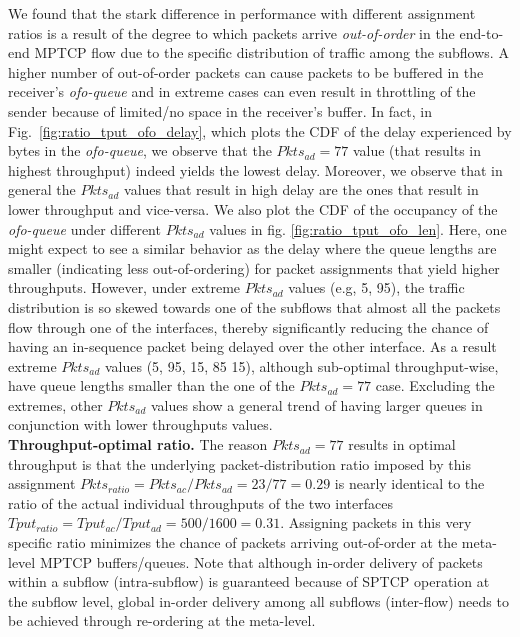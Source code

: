 We found that the stark difference in performance with different
assignment ratios is a result of the degree to which packets arrive
\textit{out-of-order} in the end-to-end MPTCP flow due to
the specific distribution of traffic among the subflows.
A higher number of out-of-order packets can cause
packets to be buffered in the receiver's \emph{ofo-queue} and in
extreme cases can even result in throttling of the sender because of
limited/no space in the receiver's buffer. In fact, in
Fig.~\ref{fig:ratio_tput_ofo_delay}, which plots the CDF of the delay
experienced by bytes in the \emph{ofo-queue}, we observe that
the $Pkts_{ad}=77$ value (that results in highest throughput) indeed
yields the lowest delay. Moreover, we observe that in general the
$Pkts_{ad}$ values that result in high delay are the ones that result
in lower throughput and vice-versa. 
We also plot the CDF of the
occupancy of the \emph{ofo-queue} under different $Pkts_{ad}$
values in fig. \ref{fig:ratio_tput_ofo_len}. Here, one might expect to
see a similar behavior as the delay where the queue lengths are smaller
(indicating less out-of-ordering) for packet assignments that yield
higher throughputs. However, under extreme $Pkts_{ad}$ values
(e.g, 5, 95), the traffic distribution is so skewed towards one of
the subflows that almost all the packets flow through one of
the interfaces, thereby significantly reducing the chance of having an
in-sequence packet being delayed over the other interface. As a result
extreme $Pkts_{ad}$ values (5, 95, 15, 85 15), although sub-optimal
throughput-wise, have queue lengths smaller than the one of the $Pkts_{ad}=77$ case.
Excluding the extremes, other $Pkts_{ad}$ values show a general trend of
having larger queues in conjunction with lower throughputs values.
\fi
\\
\noindent\textbf{Throughput-optimal ratio.} The reason $Pkts_{ad}=77$ results in optimal throughput is that
the underlying packet-distribution ratio imposed by this assignment
$Pkts_{ratio}=Pkts_{ac}/Pkts_{ad}=23/77=0.29$ is nearly identical to
the ratio of the actual individual throughputs of the two interfaces
$Tput_{ratio}=Tput_{ac}/Tput_{ad}=500/1600=0.31$. Assigning packets in
this very specific ratio minimizes the chance of packets arriving
out-of-order at the meta-level MPTCP buffers/queues. Note that
although in-order delivery of packets within a subflow (intra-subflow)
is guaranteed because of SPTCP operation at the subflow level,
global in-order delivery among all subflows (inter-flow) needs
to be achieved through re-ordering at the meta-level.
